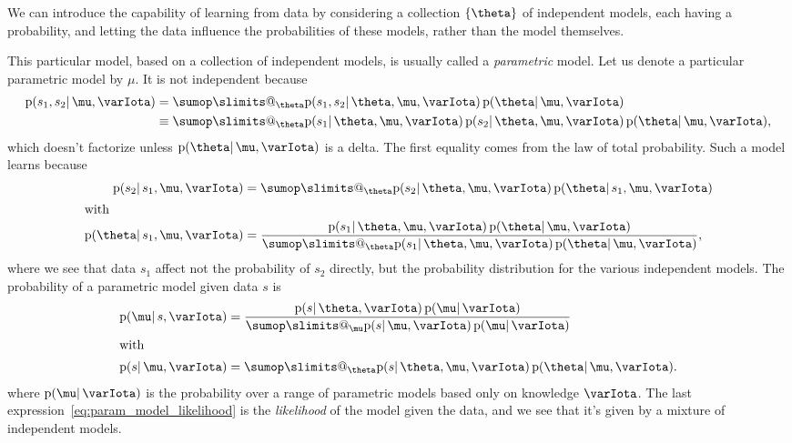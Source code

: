 \documentclass[\ifafour a4paper,12pt,\else a5paper,10pt,\fi%
onecolumn,oneside,article,%
british%
]{memoir}
\makeatletter
\theoremstyle{remark}
\theoremstyle{innote}
\def\sum{\DOTSI\sumop\slimits@}
\DeclarePairedDelimiter\set{\{}{\}}
\newcommand*{\pf}{\mathrm{p}}%
\renewcommand*{\|}{\mathpunct{|}}
\newcommand*{\yI}{\varIota}
\newcommand*{\yth}{\theta}
\newcommand*{\ymu}{\mu}
\makeatother
\begin{document}
\medskip

We can introduce the capability of learning from data by considering a
collection $\set{\yth}$ of independent models, each having a probability,
and letting the data influence the probabilities of these models, rather
than the model themselves.

This particular model, based on a collection of independent models, is
usually called a \emph{parametric} model. Let us denote a particular
parametric model by $\ymu$. It is not independent because
\begin{equation}
  \label{eq:param_model}
  \begin{aligned}
  \pf(s_1,s_2 \| \ymu, \yI) &=
\sum_{\yth}
\pf(s_1,s_2 \|\yth,\ymu,\yI) \, \pf(\yth \| \ymu,\yI)
\\&\equiv
\sum_{\yth}
\pf(s_1 \|\yth,\ymu,\yI) \, \pf(s_2 \|\yth,\ymu,\yI)
 \, \pf(\yth \| \ymu,\yI),
  \end{aligned}
\end{equation}
which doesn't factorize unless $\pf(\yth \| \ymu,\yI)$ is a delta. The
first equality comes from the law of total probability. Such a model learns
because
\begin{subequations}
    \label{eq:param_model_learn}
  \begin{align}
    \pf(s_2 \| s_1, \ymu, \yI) &=
    \sum_{\yth}
    \pf(s_2 \|\yth,\ymu,\yI) \, \pf(\yth \| s_1, \ymu,\yI)
    \\
    \shortintertext{with}
    \pf(\yth \| s_1, \ymu,\yI)
    &= \frac{
      \pf(s_1 \|\yth,\ymu,\yI) \, \pf(\yth \| \ymu,\yI)
      }{
      \sum_{\yth} \pf(s_1 \|\yth,\ymu,\yI) \, \pf(\yth \| \ymu,\yI)
      },
  \end{align}
\end{subequations}
where we see that data $s_1$ affect not the probability of $s_2$ directly,
but the probability distribution for the various independent models. The
probability of a parametric model given data $s$ is
\begin{subequations}
  \label{eq:prob_indep_model}
  \begin{align}
    \pf(\ymu \| s, \yI)
    &= \frac{
      \pf(s \|\yth,\yI) \, \pf(\ymu \| \yI)
      }{
      \sum_{\ymu}\pf(s \|\ymu,\yI) \, \pf(\ymu \| \yI)
      }
    \\
    \shortintertext{with}
    \label{eq:param_model_likelihood}
    \pf(s \|\ymu,\yI)
    & =  
      \sum_{\yth}
      \pf(s \|\yth,\ymu,\yI) \, \pf(\yth \| \ymu,\yI).
  \end{align}
\end{subequations}
where $\pf(\ymu \|\yI)$ is the probability over a range of parametric
models based only on knowledge $\yI$. The last
expression~\eqref{eq:param_model_likelihood} is the \emph{likelihood} of
the model given the data, and we see that it's given by a mixture of
independent models.
\end{document}
